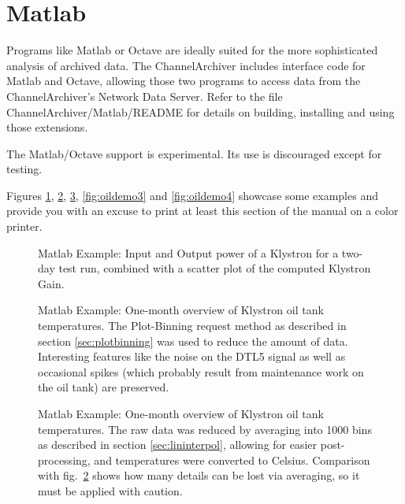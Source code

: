 \section{Matlab}
Programs like Matlab or Octave are ideally suited for the more
sophisticated analysis of archived data.  The ChannelArchiver
includes interface code for Matlab and Octave, allowing those two
programs to access data from the ChannelArchiver's Network Data
Server.  Refer to the file ChannelArchiver/Matlab/README for details
on building, installing and using those extensions.

\NOTE The Matlab/Octave support is experimental.
Its use is discouraged except for testing.

Figures \ref{fig:matlabtest}, \ref{fig:oildemo1},
\ref{fig:oildemo2}, \ref{fig:oildemo3} and
\ref{fig:oildemo4} showcase some examples and provide you with an
excuse to print at least this section of the manual on a color printer.

\begin{figure}[htb]
\begin{center}
\end{center}
\caption{\label{fig:matlabtest}Matlab Example: Input and Output power
  of a Klystron for a two-day test run, combined with a scatter plot
  of the computed Klystron Gain.}
\end{figure}

\begin{figure}[htb]
\begin{center}
\end{center}
\caption{\label{fig:oildemo1}Matlab Example: One-month overview of
  Klystron oil tank temperatures. The Plot-Binning request method as
  described in section \ref{sec:plotbinning} was used to reduce the
  amount of data. Interesting features like the noise on the DTL5
  signal as well as occasional spikes (which probably result from
  maintenance work on the oil tank) are preserved.
}
\end{figure}

\begin{figure}[htb]
\begin{center}
\end{center}
\caption{\label{fig:oildemo2}Matlab Example: One-month overview of
  Klystron oil tank temperatures. The raw data was reduced by
  averaging into 1000 bins as described in section
  \ref{sec:lininterpol}, allowing for easier post-processing,
  and temperatures were converted to Celsius.
  Comparison with fig.\ \ref{fig:oildemo1} shows how many details can
  be lost via averaging, so it must be applied with caution.
}
\end{figure}

